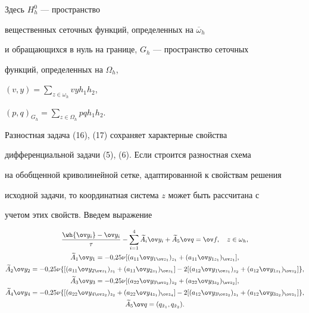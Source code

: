 Здесь $H_h^0$ --- пространство


вещественных сеточных функций, определенных на $\overline\omega_h$


и обращающихся в нуль на границе, $G_h$ --- пространство сеточных


функций, определенных на $\Omega_h$,


$(v,y)=\sum\limits_{z\in\omega_h}vyh_1h_2$,


$(p,q)_{G_h}=\sum\limits_{z\in\Omega_h}pqh_1h_2$.


Разностная задача (16), (17) сохраняет характерные свойства


дифференциальной задачи (5), (6). Если строится разностная схема


на обобщенной криволинейной сетке, адаптированной к свойствам решения


исходной задачи, то координатная система $z$ может быть рассчитана с


учетом этих свойств. Введем выражение


\begin{gather}


\frac{{\wh {\ov y_i}}-\ov y_i}{\tau}-\sum_{i=1}^4\widetilde A_i\ov


y_i+\widetilde A_5\ov q=\ov f,\quad z\in\omega_h,\\


%


\widetilde A_1\ov y_1=-0{,}25\nu[(a_{11}\ov y_{1\ov z_1})_{z_1}+


(a_{11}\ov y_{1z_1})_{\ov z_1}],\notag \\


%


\widetilde A_2\ov y_2=-0{,}25\nu\{[(a_{11}\ov y_{2\ov z_1})_{z_1}+


(a_{11}\ov y_{2z_1})_{\ov z_1}]-2[(a_{12}\ov y_{1\ov z_1})_{z_2}+


(a_{12}\ov y_{1z_1})_{\ov z_2}]\},\notag \\


%


\widetilde A_3\ov y_3=-0{,}25\nu[(a_{22}\ov y_{3\ov z_2})_{z_2}+


(a_{22}\ov y_{3z_2})_{\ov z_2}],\notag \\


%


\widetilde A_4\ov y_4=-0{,}25\nu\{[(a_{22}\ov y_{4\ov z_2})_{z_2}+


(a_{22}\ov y_{4z_1})_{\ov z_4}]-2[(a_{12}\ov y_{3\ov z_2})_{z_1}+


(a_{12}\ov y_{3z_2})_{\ov z_1}]\},\notag \\


%


\widetilde A_5\ov q=(q_{\tilde x_1},q_{\tilde x_2}).\notag


\end{gather}


